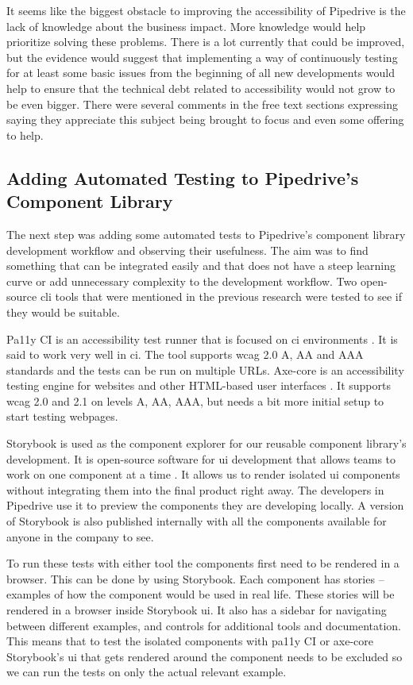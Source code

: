 \documentclass{master_thesis}
\begin{document}
It seems like the biggest obstacle to improving the accessibility of Pipedrive is the lack of knowledge about the business impact. More knowledge would help prioritize solving these problems. There is a lot currently that could be improved, but the evidence would suggest that implementing a way of continuously testing for at least some basic issues from the beginning of all new developments would help to ensure that the technical debt related to accessibility would not grow to be even bigger. There were several comments in the free text sections expressing saying they appreciate this subject being brought to focus and even some offering to help.

\subsection{Adding Automated Testing to Pipedrive's Component Library} \label{adding-a11y-tool}

The next step was adding some automated tests to Pipedrive's component library development workflow and observing their usefulness. The aim was to find something that can be integrated easily and that does not have a steep learning curve or add unnecessary complexity to the development workflow. Two open-source \ac{cli} tools that were mentioned in the previous research were tested to see if they would be suitable.

Pa11y CI is an accessibility test runner that is focused on \ac{ci} environments \citep{TeamPa11y2022}. It is said to work very well in \ac{ci}. The tool supports \ac{wcag} 2.0 A, AA and AAA standards and the tests can be run on multiple URLs. Axe-core is an accessibility testing engine for websites and other HTML-based user interfaces \citep{Deque2023}. It supports \ac{wcag} 2.0 and 2.1 on levels A, AA, AAA, but needs a bit more initial setup to start testing webpages.

Storybook is used as the component explorer for our reusable component library's development. It is open-source software for \ac{ui} development that allows teams to work on one component at a time \citep{storybook}. It allows us to render isolated \ac{ui} components without integrating them into the final product right away. The developers in Pipedrive use it to preview the components they are developing locally. A version of Storybook is also published internally with all the components available for anyone in the company to see.

To run these tests with either tool the components first need to be rendered in a browser. This can be done by using Storybook. Each component has stories – examples of how the component would be used in real life. These stories will be rendered in a browser inside Storybook \ac{ui}. It also has a sidebar for navigating between different examples, and controls for additional tools and documentation.
This means that to test the isolated components with pa11y CI or axe-core Storybook's \ac{ui} that gets rendered around the component needs to be excluded so we can run the tests on only the actual relevant example.
\end{document}
